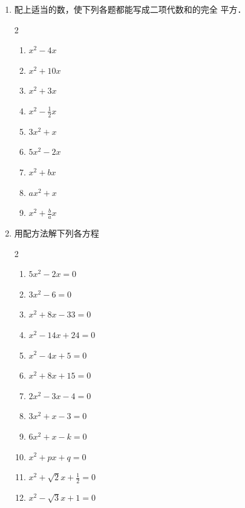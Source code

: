 \begin{enumerate}
\item 配上适当的数，使下列各题都能写成二项代数和的完全
平方．
    \begin{multicols}{2}
        \begin{enumerate}
\item $x^2-4x$
\item $x^2+10x$
\item $x^2+3x$
\item $x^2-\frac{1}{2}x$
\item $3x^2+x$
\item $5x^2-2x$
\item $x^2+bx$
\item $ ax^2+x$
\item $x^2+\frac{b}{a}x$
\end{enumerate}
\end{multicols}
\item 用配方法解下列各方程
\begin{multicols}{2}
    \begin{enumerate}
\item $5x^2-2x=0$
\item $3x^2-6=0$
\item $x^2+8x-33=0$
\item $x^2-14x+24=0$
\item $x^2-4x+5=0$
\item $x^2+8x+15=0$
\item $2x^2-3x-4=0$
\item $3x^2+x-3=0$
\item $6x^2+x-k=0$
\item $x^2+px+q=0$
\item $x^2+\sqrt{2}x+\frac{1}{2}=0$
\item $x^2-\sqrt{3}x+1=0$
        \end{enumerate}
    \end{multicols}


\end{enumerate}
